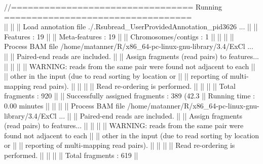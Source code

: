 \documentclass[12pt]{article}
\begin{document}
\begin{scriptsize}
\begin{Schunk}
\begin{Soutput}
//================================= Running ==================================\\
||                                                                            ||
|| Load annotation file ./.Rsubread_UserProvidedAnnotation_pid3626 ...        ||
||    Features : 19                                                           ||
||    Meta-features : 19                                                      ||
||    Chromosomes/contigs : 1                                                 ||
||                                                                            ||
|| Process BAM file /home/matanner/R/x86_64-pc-linux-gnu-library/3.4/ExCl ... ||
||    Paired-end reads are included.                                          ||
||    Assign fragments (read pairs) to features...                            ||
||                                                                            ||
||    WARNING: reads from the same pair were found not adjacent to each       ||
||             other in the input (due to read sorting by location or         ||
||             reporting of multi-mapping read pairs).                        ||
||                                                                            ||
||    Read re-ordering is performed.                                          ||
||                                                                            ||
||    Total fragments : 920                                                   ||
||    Successfully assigned fragments : 389 (42.3%)                           ||
||    Running time : 0.00 minutes                                             ||
||                                                                            ||
|| Process BAM file /home/matanner/R/x86_64-pc-linux-gnu-library/3.4/ExCl ... ||
||    Paired-end reads are included.                                          ||
||    Assign fragments (read pairs) to features...                            ||
||                                                                            ||
||    WARNING: reads from the same pair were found not adjacent to each       ||
||             other in the input (due to read sorting by location or         ||
||             reporting of multi-mapping read pairs).                        ||
||                                                                            ||
||    Read re-ordering is performed.                                          ||
||                                                                            ||
||    Total fragments : 619                                                   ||

\end{Soutput}
\end{Schunk}
\end{scriptsize}
\end{document}
